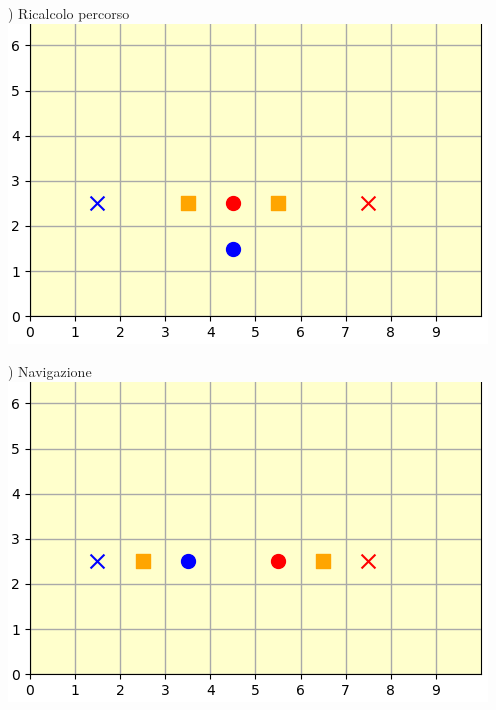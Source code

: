 \documentclass[12pt]{article}
\begin{document}
\noindent\begin{minipage}[ht]{0.45\linewidth}
) Ricalcolo percorso
\includegraphics[width=\textwidth]{SimulazioniNavigazione/2AGV_ConflittoStandard/2.png}
\end{minipage}
\begin{minipage}[ht]{0.45\linewidth}
) Navigazione
\includegraphics[width=\textwidth]{SimulazioniNavigazione/2AGV_ConflittoStandard/3.png}
\end{minipage}\\

\vspace{1cm}
\end{document}
